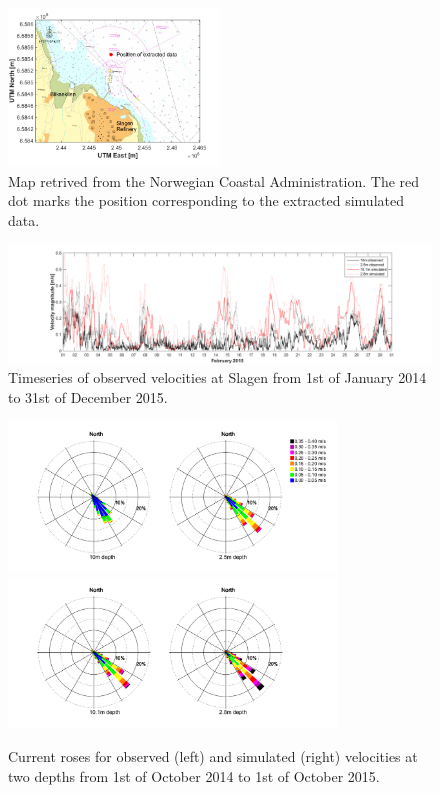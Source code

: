 \documentclass[12pt,a4paper,english]{article}
\begin{document}
\begin{figure}[t]
\centerline{
\includegraphics*[trim=1cm 0cm 1cm 0cm,clip=true,width=0.5\textwidth]{Figurer/Slagen_kart}}
\caption{\small
Map retrived from the Norwegian Coastal Administration. The red dot marks the position corresponding to the extracted simulated data.}
\label{fig:Slagen-kart}
\end{figure}

\begin{figure}[t]
\centerline{
\includegraphics*[trim=3cm 0cm 3cm 0cm,clip=true,width=\textwidth]{Figurer/Slagen_tid}}
\caption{\small
Timeseries of observed velocities at Slagen from 1st of January 2014 to 31st of December 2015.}
\label{fig:Slagen-tid}
\end{figure}

\begin{figure}[t]
\centerline{
\includegraphics*[trim=2cm 1cm 1cm 0cm,clip=true,height=4cm]{Figurer/Slagen_Rose_obs} 
\includegraphics*[trim=2cm 1cm 3cm 0cm,clip=true,height=4cm]{Figurer/Slagen_Rose_sim}
}
\caption{\small
Current roses for observed (left) and simulated (right) velocities at two depths from 1st of October 2014 to 1st of October 2015.}
\label{fig:Slagen-rose}
\end{figure}
\end{document}
